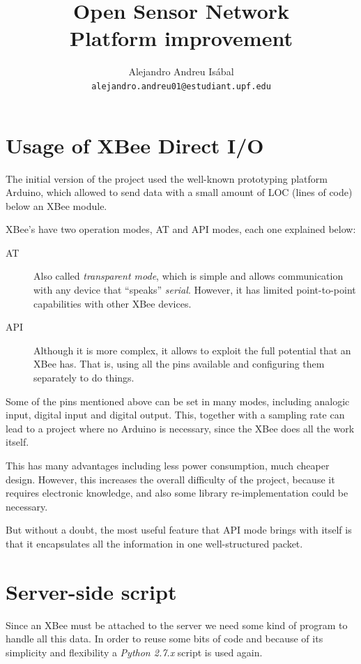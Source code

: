 \documentclass[a4paper,twocolumn]{IEEEtran}
\title{
    Open Sensor Network\\
    Platform improvement
}
\author{
    Alejandro Andreu Isábal\\
    \texttt{alejandro.andreu01@estudiant.upf.edu}
}
\begin{document}
    \maketitle

    \section{Usage of XBee Direct I/O}

    The initial version of the project used the well-known prototyping platform Arduino, which allowed to send data with a small amount of LOC (lines of code) below an XBee module.

    XBee's have two operation modes, AT and API modes, each one explained below:
    \begin{description}
        \item[AT] Also called \emph{transparent mode}, which is simple and allows communication with any device that ``speaks'' \emph{serial}. However, it has limited point-to-point capabilities with other XBee devices.
        \item[API] Although it is more complex, it allows to exploit the full potential that an XBee has. That is, using all the pins available and configuring them separately to do things.
    \end{description}

    Some of the pins mentioned above can be set in many modes, including analogic input, digital input and digital output. This, together with a sampling rate can lead to a project where no Arduino is necessary, since the XBee does all the work itself.

    This has many advantages including less power consumption, much cheaper design. However, this increases the overall difficulty of the project, because it requires electronic knowledge, and also some library re-implementation could be necessary.

    But without a doubt, the most useful feature that API mode brings with itself is that it encapsulates all the information in one well-structured packet.


    \section{Server-side script}
        
    Since an XBee must be attached to the server we need some kind of program to handle all this data. In order to reuse some bits of code and because of its simplicity and flexibility a \emph{Python 2.7.x} script is used again.
\end{document}
